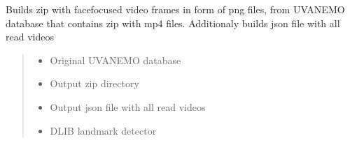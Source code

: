 \documentclass[letterpaper,10pt,english]{sphinxmanual}
\begin{document}
\begin{fulllineitems}
\label{\detokenize{extract_movie_frames:extract_movie_frames.extract_frames_from_database}}
\pysigstartsignatures
{}
\pysigstopsignatures
\sphinxAtStartPar
Builds zip with face\sphinxhyphen{}focused video frames in form of png files, from UVA\sphinxhyphen{}NEMO database that contains zip with mp4 files. Additionaly builds json file with all read videos
\begin{quote}\begin{description}
\begin{itemize}
\item {} 
\sphinxAtStartPar
{} \textendash{} Original UVA\sphinxhyphen{}NEMO database

\item {} 
\sphinxAtStartPar
{} \textendash{} Output zip directory

\item {} 
\sphinxAtStartPar
{} \textendash{} Output json file with all read videos

\item {} 
\sphinxAtStartPar
{} \textendash{} DLIB landmark detector

\end{itemize}

\end{description}\end{quote}

\end{fulllineitems}

\end{document}
